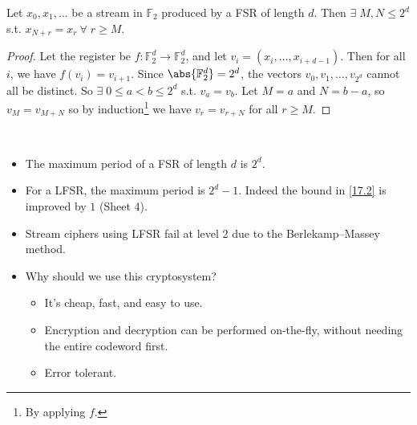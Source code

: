\begin{lemma} \label{17.2}
    Let $x_0, x_1, \dots$ be a stream in $\mathbb F_2$ produced by a FSR of length $d$.
    Then $\exists \; M, N \leq 2^d$ s.t. $x_{N+r} = x_{r} \ \forall \; r \geq M$.
\end{lemma}

\begin{proof}
    Let the register be $f \colon \mathbb F_2^d \to \mathbb F_2^d$, and let $v_i = (x_i, \dots, x_{i+d-1})$.
    Then for all $i$, we have $f(v_i) = v_{i+1}$.
    Since $\abs{\mathbb F_2^d} = 2^d$, the vectors $v_0, v_1, \dots, v_{2^d}$ cannot all be distinct.
    So $\exists \; 0 \leq a < b \leq 2^d$ s.t. $v_a = v_b$.
    Let $M = a$ and $N = b - a$, so $v_M = v_{M+N}$ so by induction\footnote{By applying $f$.} we have $v_r = v_{r+N}$ for all $r \geq M$.
\end{proof}

\begin{remark} ~
    \begin{itemize}
        \item The maximum period of a FSR of length $d$ is $2^d$.
        \item For a LFSR, the maximum period is $2^d - 1$.
        Indeed the bound in \cref{17.2} is improved by $1$ (Sheet 4).
        \item Stream ciphers using LFSR fail at level 2 due to the Berlekamp--Massey method.
        \item Why should we use this cryptosystem?
        \begin{itemize}
            \item It's cheap, fast, and easy to use.
            \item Encryption and decryption can be performed on-the-fly, without needing the entire codeword first.
            \item Error tolerant.
        \end{itemize}
    \end{itemize}
\end{remark}


